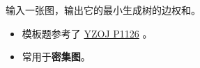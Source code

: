 \noindent 输入一张图，输出它的最小生成树的边权和。

\begin{itemize}
    \item 模板题参考了 \href{https://oiproxy.bugminer.top/OnlineJudge/problem_show.php?id=1126}{YZOJ P1126} 。
    \item 常用于\textbf{密集图}。
\end{itemize}
